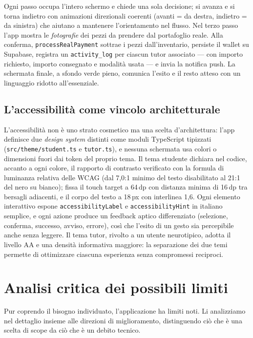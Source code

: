\documentclass[11pt,a4paper]{article}
\begin{document}
Ogni passo occupa l'intero schermo e chiede una sola decisione; si avanza e si torna indietro con
animazioni direzionali coerenti (avanti = da destra, indietro = da sinistra) che aiutano a
mantenere l'orientamento nel flusso. Nel terzo passo l'app mostra le \emph{fotografie} dei pezzi
da prendere dal portafoglio reale. Alla conferma, \texttt{processRealPayment} sottrae i pezzi
dall'inventario, persiste il wallet su Supabase, registra un \texttt{activity\_log} per ciascun
tutor associato --- con importo richiesto, importo consegnato e modalit\`a usata --- e invia la
notifica push. La schermata finale, a sfondo verde pieno, comunica l'esito e il resto atteso con
un linguaggio ridotto all'essenziale.

\subsection{L'accessibilit\`a come vincolo architetturale}

L'accessibilit\`a non \`e uno strato cosmetico ma una scelta d'architettura: l'app definisce due
\emph{design system} distinti come moduli TypeScript tipizzati (\texttt{src/theme/student.ts} e
\texttt{tutor.ts}), e nessuna schermata usa colori o dimensioni fuori dai token del proprio tema.
Il tema studente dichiara nel codice, accanto a ogni colore, il rapporto di contrasto verificato
con la formula di luminanza relativa delle WCAG (dal 7{,}0:1 minimo del testo disabilitato al 21:1
del nero su bianco); fissa il touch target a 64\,dp con distanza minima di 16\,dp tra bersagli
adiacenti, e il corpo del testo a 18\,px con interlinea 1{,}6. Ogni elemento interattivo espone
\texttt{accessibilityLabel} e \texttt{accessibilityHint} in italiano semplice, e ogni azione
produce un feedback aptico differenziato (selezione, conferma, successo, avviso, errore), cos\`i
che l'esito di un gesto sia percepibile anche senza leggere. Il tema tutor, rivolto a un utente
neurotipico, adotta il livello AA e una densit\`a informativa maggiore: la separazione dei due
temi permette di ottimizzare ciascuna esperienza senza compromessi reciproci.

\section{Analisi critica dei possibili limiti}

Pur coprendo il bisogno individuato, l'applicazione ha limiti noti. Li analizziamo nel dettaglio
insieme alle direzioni di miglioramento, distinguendo ci\`o che \`e una scelta di scope da ci\`o
che \`e un debito tecnico.
\end{document}
